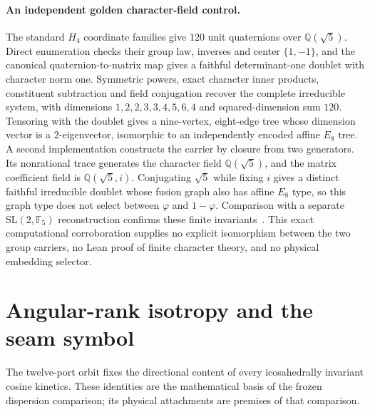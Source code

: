 \documentclass[11pt]{article}
\theoremstyle{remark}
\theoremstyle{plain}
\begin{document}
\paragraph{An independent golden character-field control.}
The standard \(H_4\) coordinate families give \(120\) unit quaternions over
\(\mathbb Q(\sqrt5)\). Direct enumeration checks their group law, inverses
and center \(\{1,-1\}\), and the canonical quaternion-to-matrix map gives a
faithful determinant-one doublet with character norm one. Symmetric powers,
exact character inner products, constituent subtraction and field
conjugation recover the complete irreducible system, with dimensions
\(1,2,2,3,3,4,5,6,4\) and squared-dimension sum \(120\). Tensoring with the
doublet gives a nine-vertex, eight-edge tree whose dimension vector is a
\(2\)-eigenvector, isomorphic to an independently encoded affine \(E_8\)
tree. A second implementation constructs the carrier by closure from two
generators. Its nonrational trace generates the character field
\(\mathbb Q(\sqrt5)\), and the matrix coefficient field is
\(\mathbb Q(\sqrt5,i)\). Conjugating \(\sqrt5\) while fixing \(i\) gives a
distinct faithful irreducible doublet whose fusion graph also has affine
\(E_8\) type, so this graph type does not select between \(\varphi\) and
\(1-\varphi\). Comparison with a separate \(\mathrm{SL}(2,\mathbb F_5)\)
reconstruction confirms these finite invariants~\cite{ophrepo}. This exact
computational corroboration supplies no explicit isomorphism between the two
group carriers, no Lean proof of finite character theory, and no physical
embedding selector.

\section{Angular-rank isotropy and the seam symbol}
\label{sec:angular-rank-isotropy}

The twelve-port orbit fixes the directional content of every
icosahedrally invariant cosine kinetics. These identities are the
mathematical basis of the frozen dispersion comparison; its physical
attachments are premises of that comparison.
\end{document}
